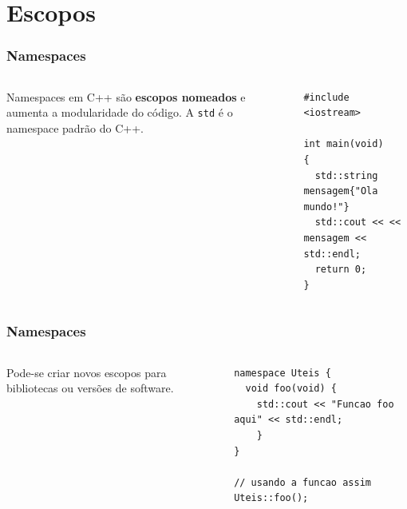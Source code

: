 \documentclass[xcolor={usenames,dvipsnames},10pt,presentation,aspectratio=169]{beamer}
\begin{document}
\section{Escopos}
\begin{frame}[fragile]
  \frametitle{Namespaces}
  \vspace{-2mm}
    \begin{columns}
      \begin{column}{0.4\textwidth}
Namespaces em C++ são \textbf{escopos nomeados}  e aumenta a modularidade do código.
A \verb+std+ é o namespace padrão do C++.
     \end{column}
      \begin{column}{0.6\textwidth}
  \begin{block}{}
\begin{lstlisting}
#include <iostream>

int main(void)
{
  std::string mensagem{"Ola mundo!"}
  std::cout << << mensagem << std::endl;
  return 0;
}
\end{lstlisting}
\end{block}
      \end{column}
    \end{columns}
%
\end{frame}
\begin{frame}[fragile]
  \frametitle{Namespaces}
  \vspace{-2mm}
    \begin{columns}
      \begin{column}{0.4\textwidth}
        Pode-se criar novos escopos para bibliotecas ou versões de software.
     \end{column}
      \begin{column}{0.6\textwidth}
  \begin{block}{}
\begin{lstlisting}
namespace Uteis {
  void foo(void) {
    std::cout << "Funcao foo aqui" << std::endl;
    }
}

// usando a funcao assim
Uteis::foo();
\end{lstlisting}
\end{block}
      \end{column}
    \end{columns}
%
\end{frame}
\end{document}
